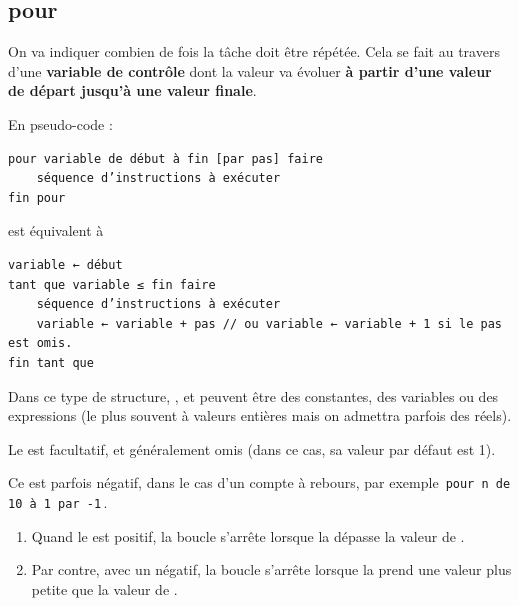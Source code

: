 \documentclass[11pt,a4paper]{article}
\begin{document}
        \subsection{pour}
        On va indiquer combien de fois la t\^ache doit \^etre r\'ep\'et\'ee. Cela se fait au travers
        d'une \textbf{variable de contr\^ole} dont la valeur 
        va \'evoluer \textbf{\`a partir d'une valeur de d\'epart jusqu'\`a une valeur finale}.
      
            \par
        En pseudo-code :
            \par
        \begin{verbatim}
pour variable de début à fin [par pas] faire
    séquence d’instructions à exécuter
fin pour
      \end{verbatim} est \'equivalent \`a 
            \par
        \begin{verbatim}
variable ← début
tant que variable ≤ fin faire
    séquence d’instructions à exécuter
    variable ← variable + pas // ou variable ← variable + 1 si le pas est omis.
fin tant que
      \end{verbatim}
        Dans ce type de structure, , 
        \verb@fin@ et \verb@pas@ 
        peuvent \^etre des constantes, des variables ou
        des expressions (le plus souvent \`a valeurs enti\`eres mais on admettra parfois des r\'eels). 
      
            \par
        
        Le \verb@pas@ est facultatif, et g\'en\'eralement omis (dans ce cas, sa valeur par d\'efaut est 1). 
      
            \par
        
        Ce \verb@pas@ est parfois n\'egatif, dans le cas d'un compte \`a rebours, 
        par exemple \,\verb|pour n de 10 à 1 par -1|\,.
      
            \par
        
					\begin{enumerate}
				
			\item 
            Quand le \verb@pas@ est positif, 
            la boucle s'arr\^ete lorsque la \verb@variable@ 
            d\'epasse la valeur de \verb@fin@.
          
			\item 
            Par contre, avec un \verb@pas@ n\'egatif, 
            la boucle s'arr\^ete lorsque la \verb@variable@ 
            prend une valeur plus petite que la valeur de \verb@fin@.
          
					\end{enumerate}
				
\end{document}
